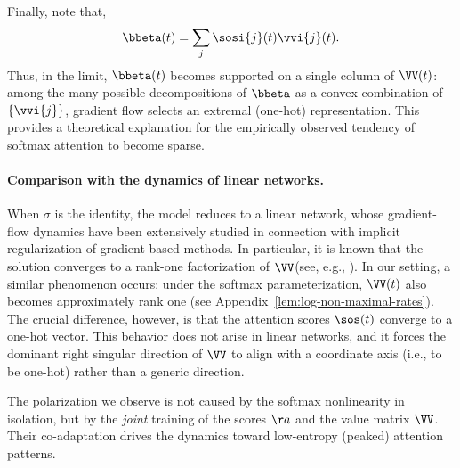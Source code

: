\documentclass{article}
\theoremstyle{plain}
\theoremstyle{definition}
\theoremstyle{remark}
\begin{document}
%
Finally, note that,
\begin{align*}
  \bbeta(t) = \sum_j \sosi{j}(t) \vvi{j}(t).
\end{align*}
Thus, in the limit, $\bbeta(t)$ becomes supported on a single column of $\VV(t)$: among the many possible decompositions of $\bbeta$ as a convex combination of $\{\vvi{j}\}$, gradient flow selects an extremal (one-hot) representation. This provides a theoretical explanation for the empirically observed tendency of softmax attention to become sparse.

\paragraph{Comparison with the dynamics of linear networks.}
%
When $\sigma$ is the identity, the model reduces to a linear network, whose gradient-flow dynamics have been extensively studied in connection with implicit regularization of gradient-based methods. In particular, it is known that the solution converges to a rank-one factorization of $\VV $(see, e.g., \cite{ji2018gradient}). 
%
In our setting, a similar phenomenon occurs: under the softmax parameterization, $\VV(t)$ also becomes approximately rank one (see Appendix~\ref{lem:log-non-maximal-rates}). The crucial difference, however, is that the attention scores $\sos(t)$ converge to a one-hot vector. This behavior does not arise in linear networks, and it forces the dominant right singular direction of $\VV$ to align with a coordinate axis (i.e., to be one-hot) rather than a generic direction.
%

The polarization we observe is not caused by the softmax nonlinearity in isolation, but by the \emph{joint} training of the scores $\aa$ and the value matrix $\VV$. Their co-adaptation drives the dynamics toward low-entropy (peaked) attention patterns.
\end{document}
